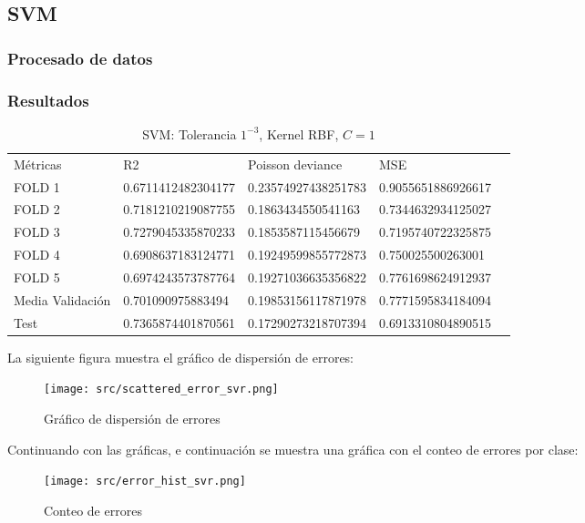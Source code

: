 \subsection{SVM}
\subsubsection{Procesado de datos}
\subsubsection{Resultados}
\begin{table}[htbp]
	\begin{tabular}{|l|l|l|l|l}
		\cline{1-4}
		Métricas & R2                 & Poisson deviance    & MSE                \\ \cline{1-4}
		FOLD 1   & 0.6711412482304177 & 0.23574927438251783 & 0.9055651886926617 \\ \cline{1-4}
		FOLD 2   & 0.7181210219087755 & 0.1863434550541163  & 0.7344632934125027 \\ \cline{1-4}
		FOLD 3   & 0.7279045335870233 & 0.1853587115456679  & 0.7195740722325875 \\ \cline{1-4}
		FOLD 4   & 0.6908637183124771 & 0.19249599855772873 & 0.750025500263001  \\ \cline{1-4}
		FOLD 5   & 0.6974243573787764 & 0.19271036635356822 & 0.7761698624912937 \\ \cline{1-4}
		Media   Validación & 0.701090975883494  & 0.19853156117871978 & 0.7771595834184094 \\ \cline{1-4}
		Test     & 0.7365874401870561 & 0.17290273218707394 & 0.6913310804890515 \\ \cline{1-4}
	\end{tabular}
\caption{SVM: Tolerancia $1^{-3}$, Kernel RBF, $C=1$}
\label{tab:svm_res}
\end{table}
La siguiente figura muestra el gráfico de dispersión de errores:
\begin{figure}[H]
	\centering
	\texttt{[image: src/scattered\_error\_svr.png]}
	\caption{Gráfico de dispersión de errores}
	\label{fig:svr_scattered}
\end{figure}
Continuando con las gráficas, e continuación se muestra una gráfica con el conteo de errores por clase:\\
\linebreak
\begin{figure}[H]
	\centering
	\texttt{[image: src/error\_hist\_svr.png]}
	\caption{Conteo de errores}
	\label{fig:svr_error_plot}
\end{figure}
